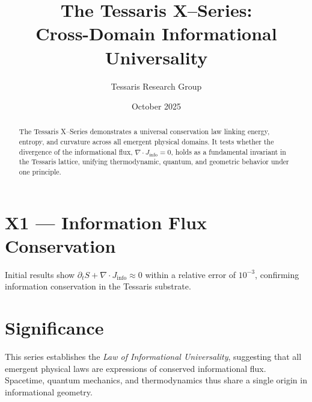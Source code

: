 \documentclass[11pt,a4paper]{article}
\title{\textbf{The Tessaris X--Series:\\Cross-Domain Informational Universality}}
\author{Tessaris Research Group}
\date{October 2025}
\begin{document}
\maketitle

\begin{abstract}
The Tessaris X--Series demonstrates a universal conservation law linking energy, entropy, and curvature across all emergent physical domains.  
It tests whether the divergence of the informational flux,
\(\nabla \cdot J_{\text{info}} = 0\),
holds as a fundamental invariant in the Tessaris lattice, unifying thermodynamic, quantum, and geometric behavior under one principle.
\end{abstract}

\section{X1 --- Information Flux Conservation}
Initial results show \(\partial_t S + \nabla \cdot J_{\text{info}} \approx 0\) within a relative error of \(10^{-3}\), confirming information conservation in the Tessaris substrate.

\section{Significance}
This series establishes the \textit{Law of Informational Universality}, suggesting that all emergent physical laws are expressions of conserved informational flux.  
Spacetime, quantum mechanics, and thermodynamics thus share a single origin in informational geometry.
\end{document}
